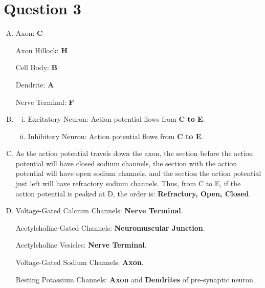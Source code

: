 \documentclass{article}
\begin{document}
\section*{ Question 3 }

\begin{enumerate}[A.]
    \item Axon: \textbf{C}

        Axon Hillock: \textbf{H}

        Cell Body: \textbf{B}

        Dendrite: \textbf{A}

        Nerve Terminal: \textbf{F}

    \item 
        \begin{enumerate}[i.]
            \item Excitatory Neuron: Action potential flows from \textbf{C to E}.

            \item Inhibitory Neuron: Action potential flows from \textbf{C to E}.
        \end{enumerate} 

    \item As the action potential travels down the axon, the section before the
        action potential will have closed sodium channels, the section with the
        action potential will have open sodium channels, and the section the
        action potential just left will have refractory sodium channels. Thus,
        from C to E, if the action potential is peaked at D, the order is:
        \textbf{Refractory, Open, Closed}.

    \item Voltage-Gated Calcium Channels: \textbf{Nerve Terminal}.

        Acetylcholine-Gated Channels: \textbf{Neuromuscular Junction}.

        Acetylcholine Vesicles: \textbf{Nerve Terminal}.

        Voltage-Gated Sodium Channels: \textbf{Axon}.

        Resting Potassium Channels: \textbf{Axon} and \textbf{Dendrites} of
        pre-synaptic neuron.


\end{enumerate}
\end{document}
